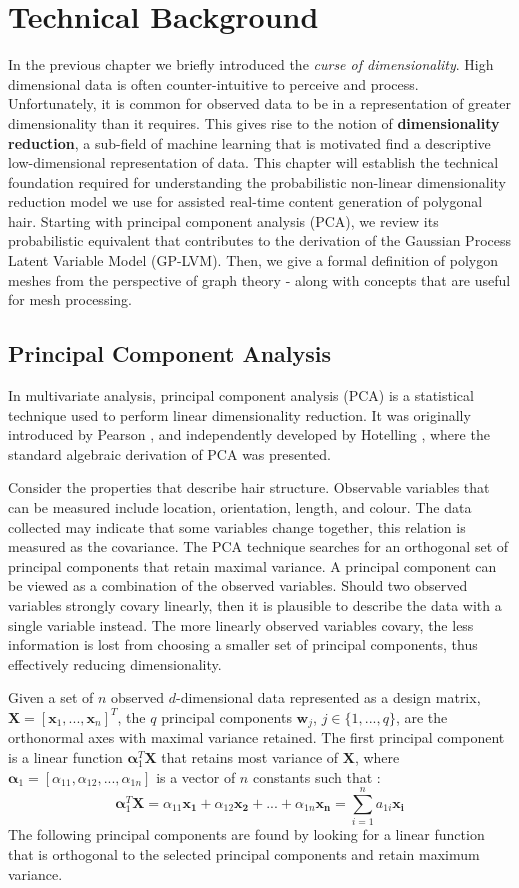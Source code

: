 \documentclass[ %
author={Dillon Keith Diep},
supervisor={Dr. Carl Henrik Ek},
degree={MEng},
title={ART-CG Hair:},
subtitle={Assisted Real-time Content Generation of Stylised Virtual Hair},
type={Research},
year={2017} ]{dissertation}
\begin{document}
\chapter{Technical Background}
\label{chap:technical}
In the previous chapter we briefly introduced the \textit{curse of dimensionality}. High dimensional data is often counter-intuitive to perceive and process. Unfortunately, it is common for observed data to be in a representation of greater dimensionality than it requires. This gives rise to the notion of \textbf{dimensionality reduction}, a sub-field of machine learning that is motivated find a descriptive low-dimensional representation of data.
This chapter will establish the technical foundation required for understanding the probabilistic non-linear dimensionality reduction model we use for assisted real-time content generation of polygonal hair. Starting with principal component analysis (PCA), we review its probabilistic equivalent that contributes to the derivation of the Gaussian Process Latent Variable Model (GP-LVM). Then, we give a formal definition of polygon meshes from the perspective of graph theory - along with concepts that are useful for mesh processing.

\section{Principal Component Analysis}
In multivariate analysis, principal component analysis (PCA) is a statistical technique used to perform linear dimensionality reduction. It was originally introduced by Pearson \cite{pca1901}, and independently developed by Hotelling \cite{pca1933}, where the standard algebraic derivation of PCA was presented.

Consider the properties that describe hair structure. Observable variables that can be measured include location, orientation, length, and colour. The data collected may indicate that some variables change together, this relation is measured as the covariance. The PCA technique searches for an orthogonal set of principal components that retain maximal variance. A principal component can be viewed as a combination of the observed variables. Should two observed variables strongly covary linearly, then it is plausible to describe the data with a single variable instead. The more linearly observed variables covary, the less information is lost from choosing a smaller set of principal components, thus effectively reducing dimensionality.

Given a set of $n$ observed $d$-dimensional data represented as a design matrix, $\bm{X}=[\bm{x}_1,...,\bm{x}_n]^T$, the $q$ principal components $\bm{w}_j$, $j \in \{1,...,q\}$, are the orthonormal axes with maximal variance retained. The first principal component is a linear function $\bm{\alpha}^T_1\bm{X}$ that retains most variance of $\bm{X}$, where $\bm{\alpha}_1 = [\alpha_{11}, \alpha_{12}, ..., \alpha_{1n}]$ is a vector of $n$ constants such that \cite[p.4]{pca2002}:
$$\bm{\alpha}^T_1\bm{X}=\alpha_{11}\bm{x_1}+\alpha_{12}\bm{x_2}+...+\alpha_{1n}\bm{x_n} = \sum^n_{i=1}a_{1i}\bm{x_i}$$
The following principal components are found by looking for a linear function that is orthogonal to the selected principal components and retain maximum variance.
\end{document}
